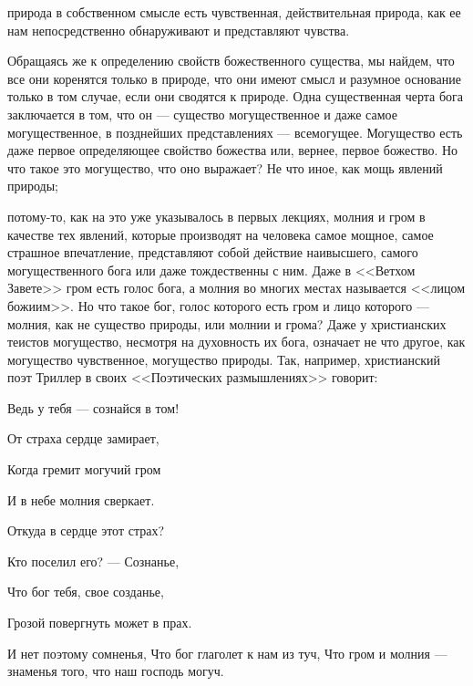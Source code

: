 \documentclass[12pt]{article}
\begin{document}
природа в собственном смысле есть чувственная, действительная природа, как ее нам непосредственно обнаруживают и представляют чувства. 

Обращаясь же к определению свойств божественного существа, мы найдем, что все они коренятся только в природе, что они имеют смысл и разумное основание только в том случае, если они сводятся к природе. Одна существенная черта бога заключается в том, что он --- существо могущественное и даже самое могущественное, в позднейших представлениях --- всемогущее. Могущество есть даже первое определяющее свойство божества или, вернее, первое божество. Но что такое это могущество, что оно выражает? Не что иное, как мощь явлений природы; 

потому-то, как на это уже указывалось в первых лекциях, молния и гром в качестве тех явлений, которые производят на человека самое мощное, самое страшное впечатление, представляют собой действие наивысшего, самого могущественного бога или даже тождественны с ним. Даже в <<Ветхом Завете>> гром есть голос бога, а молния во многих местах называется <<лицом божиим>>. Но что такое бог, голос которого есть гром и лицо которого --- молния, как не существо природы, или молнии и грома? Даже у христианских теистов могущество, несмотря на духовность их бога, означает не что другое, как могущество чувственное, могущество природы. Так, например, христианский поэт Триллер в своих <<Поэтических размышлениях>> говорит: 

Ведь у тебя --- сознайся в том! 

От страха сердце замирает, 

Когда гремит могучий гром 

И в небе молния сверкает. 

Откуда в сердце этот страх? 

Кто поселил его? --- Сознанье, 

Что бог тебя, свое созданье, 

Грозой повергнуть может в прах. 

И нет поэтому сомненья, Что бог глаголет к нам из туч, Что гром и молния --- знаменья того, что наш господь могуч. 
\end{document}
